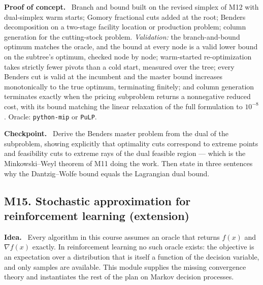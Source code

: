 \documentclass[11pt,a4paper]{article}
\newcommand{\mpart}[1]{\smallskip\noindent\textbf{#1}\ \ignorespaces}
\begin{document}
\mpart{Proof of concept.} Branch and bound built on the revised simplex of M12 with
dual-simplex warm starts; Gomory fractional cuts added at the root; Benders decomposition on a
two-stage facility location or production problem; column generation for the cutting-stock
problem. \emph{Validation:} the branch-and-bound optimum matches the oracle, and the bound at
every node is a valid lower bound on the subtree's optimum, checked node by node; warm-started
re-optimization takes strictly fewer pivots than a cold start, measured over the tree; every
Benders cut is valid at the incumbent and the master bound increases monotonically to the true
optimum, terminating finitely; and column generation terminates exactly when the pricing
subproblem returns a nonnegative reduced cost, with its bound matching the linear relaxation of
the full formulation to $10^{-8}$. Oracle: \texttt{python-mip} or \texttt{PuLP}.

\mpart{Checkpoint.} Derive the Benders master problem from the dual of the subproblem, showing
explicitly that optimality cuts correspond to extreme points and feasibility cuts to extreme
rays of the dual feasible region --- which is the Minkowski--Weyl theorem of M11 doing the work.
Then state in three sentences why the Dantzig--Wolfe bound equals the Lagrangian dual bound.

\subsection{M15. Stochastic approximation for reinforcement learning (extension)}

\mpart{Idea.} Every algorithm in this course assumes an oracle that returns $f(x)$ and
$\nabla f(x)$ exactly. In reinforcement learning no such oracle exists: the objective is an
expectation over a distribution that is itself a function of the decision variable, and only
samples are available. This module supplies the missing convergence theory and instantiates the
rest of the plan on Markov decision processes.
\end{document}
